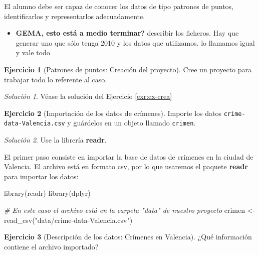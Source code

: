 \documentclass[
]{book}
\newenvironment{Shaded}{\begin{snugshade}}{\end{snugshade}}
\newcommand{\CommentTok}[1]{\textcolor[rgb]{0.56,0.35,0.01}{\textit{#1}}}
\newcommand{\FunctionTok}[1]{\textcolor[rgb]{0.00,0.00,0.00}{#1}}
\newcommand{\NormalTok}[1]{#1}
\newcommand{\OtherTok}[1]{\textcolor[rgb]{0.56,0.35,0.01}{#1}}
\newcommand{\StringTok}[1]{\textcolor[rgb]{0.31,0.60,0.02}{#1}}
\providecommand{\tightlist}{%
  \setlength{\itemsep}{0pt}\setlength{\parskip}{0pt}}
\theoremstyle{definition}
\theoremstyle{definition}
\theoremstyle{definition}
\newtheorem{exercise}{Ejercicio}[chapter]
\theoremstyle{definition}
\theoremstyle{remark}
\newtheorem*{solution}{Solución}
\begin{document}
El alumno debe ser capaz de conocer los datos de tipo patrones de puntos,
identificarlos y representarlos adecuadamente.

\begin{itemize}
\tightlist
\item
  \textbf{GEMA, esto está a medio terminar?} describir los ficheros. Hay que
  generar uno que sólo tenga 2010 y los datos que utilizamos. lo llamamos
  igual y vale todo
\end{itemize}

\begin{exercise}[Patrones de puntos: Creación del proyecto]
\protect\hypertarget{exr:ex24}{}\label{exr:ex24}Cree un proyecto para trabajar todo lo referente al caso.
\end{exercise}

\begin{solution}
Véase la solución del Ejercicio \ref{exr:ex-crea}
\end{solution}

\begin{exercise}[Importación de los datos de crímenes]
\protect\hypertarget{exr:ex25}{}\label{exr:ex25}Importe los datos \texttt{crime-data-Valencia.csv} y guárdelos en un objeto llamado
\texttt{crimen}.
\end{exercise}

\begin{solution}
Use la librería \textbf{readr}.
\end{solution}

El primer paso consiste en importar la base de datos de crímenes en la ciudad de
Valencia. El archivo está en formato csv, por lo que usaremos el paquete
\textbf{readr} \citep{R-readr} para importar los datos:

\begin{Shaded}
\begin{Highlighting}[]
\FunctionTok{library}\NormalTok{(readr)}
\FunctionTok{library}\NormalTok{(dplyr)}

\CommentTok{\# En este caso el archivo está en la carpeta "data" de nuestro proyecto}
\NormalTok{crimen }\OtherTok{\textless{}{-}} \FunctionTok{read\_csv}\NormalTok{(}\StringTok{"data/crime{-}data{-}Valencia.csv"}\NormalTok{)}
\end{Highlighting}
\end{Shaded}

\begin{exercise}[Descripción de los datos: Crímenes en Valencia]
\protect\hypertarget{exr:ex26}{}\label{exr:ex26}¿Qué información contiene el archivo importado?
\end{exercise}
\end{document}

